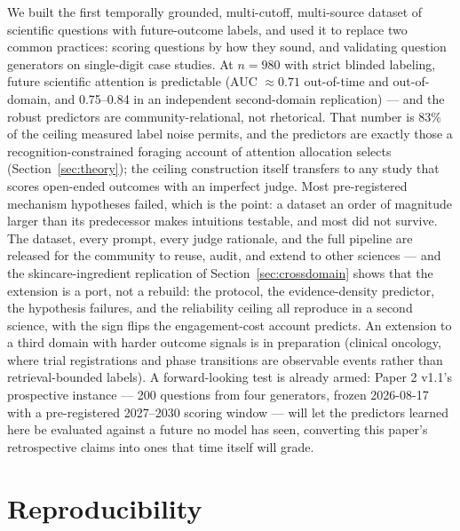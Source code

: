 \documentclass[11pt]{article}
\begin{document}
We built the first temporally grounded, multi-cutoff, multi-source
dataset of scientific questions with future-outcome labels, and used it
to replace two common practices: scoring questions by how they sound,
and validating question generators on single-digit case studies. At
$n=980$ with strict blinded labeling, future scientific attention is
predictable (AUC $\approx 0.71$ out-of-time and out-of-domain, and
0.75--0.84 in an independent second-domain replication) --- and
the robust predictors are community-relational, not rhetorical. That
number is 83\% of the ceiling measured label noise permits, and the
predictors are exactly those a recognition-constrained foraging account
of attention allocation selects (Section~\ref{sec:theory}); the
ceiling construction itself transfers to any study that scores
open-ended outcomes with an imperfect judge. Most
pre-registered mechanism hypotheses failed, which is the point: a
dataset an order of magnitude larger than its predecessor makes
intuitions testable, and most did not survive. The dataset, every
prompt, every judge rationale, and the full pipeline are released for
the community to reuse, audit, and extend to other sciences --- and the
skincare-ingredient replication of Section~\ref{sec:crossdomain} shows
that the extension is a port, not a rebuild: the protocol, the
evidence-density predictor, the hypothesis failures, and the
reliability ceiling all reproduce in a second science, with the sign
flips the engagement-cost account predicts. An extension to a third
domain with harder outcome signals is in preparation (clinical
oncology, where trial registrations and phase transitions are
observable events rather than retrieval-bounded labels). A
forward-looking test is already armed: Paper 2 v1.1's prospective
instance --- 200 questions from four generators, frozen 2026-08-17 with
a pre-registered 2027--2030 scoring window --- will let the predictors
learned here be evaluated against a future no model has seen,
converting this paper's retrospective claims into ones that time itself
will grade.

\section*{Reproducibility}
\end{document}
